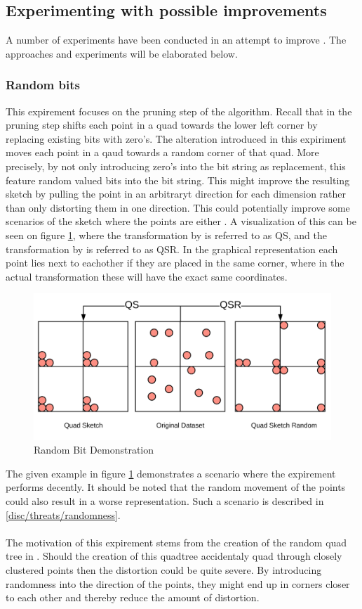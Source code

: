 \subsection{Experimenting with possible improvements}
A number of experiments have been conducted in an attempt to improve \qs{}. The approaches and experiments will be elaborated below.

\subsubsection{Random bits}
This expirement focuses on the pruning step of the algorithm. Recall that in the pruning step \qs{} shifts each point in a quad towards the lower left corner by replacing existing bits with zero's. The alteration introduced in this expiriment moves each point in a qaud towards a random corner of that quad. More precisely, by not only introducing zero's into the bit string as replacement, this feature random valued bits into the bit string. This might improve the resulting sketch by pulling the point in an arbitraryt direction for each dimension rather than only distorting them in one direction.  This could potentially improve some scenarios of the sketch where the points are either . A visualization of this can be seen on figure \ref{fig:randombits}, where the transformation by \qs{} is referred to as QS, and the transformation by \qsr{} is referred to as QSR. In the graphical representation each point lies next to eachother if they are placed in the same corner, where in the actual transformation these will have the exact same coordinates. 
\begin{figure}[h]
\includegraphics[width=1\textwidth]{figures/randombits}
\caption{Random Bit Demonstration}
\label{fig:randombits}
\end{figure}
The given example in figure \ref{fig:randombits} demonstrates a scenario where the expirement performs decently. It should be noted that the random movement of the points could also result in a worse representation. Such a scenario is described in \ref{disc/threats/randomness}.
\\
\\
The motivation of this expirement stems from the creation of the random quad tree in \qs{}. Should the creation of this quadtree accidentaly quad through closely clustered points then the distortion could be quite severe. By introducing randomness into the direction of the points, they might end up in corners closer to each other and thereby reduce the amount of distortion.  
\clearpage